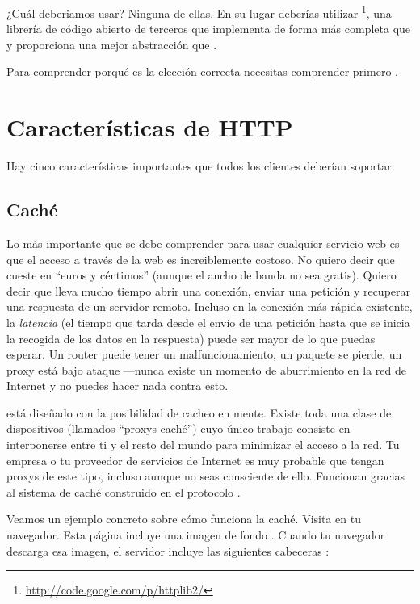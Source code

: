¿Cuál deberiamos usar? Ninguna de ellas. En su lugar deberías utilizar \footnote{\href{http://code.google.com/p/httplib2/}{http://code.google.com/p/httplib2/}}, una librería de código abierto de terceros que implementa  de forma más completa que  y proporciona una mejor abstracción que .

Para comprender porqué  es la elección correcta necesitas comprender primero .

\section{Características de HTTP}

Hay cinco características importantes que todos los clientes  deberían soportar.

\subsection{Caché}

Lo más importante que se debe comprender para usar cualquier servicio web es que el acceso a través de la web es increiblemente costoso. No quiero decir que cueste en ``euros y céntimos'' (aunque el ancho de banda no sea gratis). Quiero decir que lleva mucho tiempo abrir una conexión, enviar una petición y recuperar una respuesta de un servidor remoto. Incluso en la conexión más rápida existente, la \emph{latencia} (el tiempo que tarda desde el envío de una petición hasta que se inicia la recogida de los datos en la respuesta) puede ser mayor de lo que puedas esperar. Un router puede tener un malfuncionamiento, un paquete se pierde, un proxy está bajo ataque ---nunca existe un momento de aburrimiento en la red de Internet y no puedes hacer nada contra esto.


 está diseñado con la posibilidad de cacheo en mente. Existe toda una clase de dispositivos (llamados ``proxys caché'') cuyo único trabajo consiste en interponerse entre ti y el resto del mundo para minimizar el acceso a la red. Tu empresa o tu proveedor de servicios de Internet es muy probable que tengan proxys de este tipo, incluso aunque no seas consciente de ello. Funcionan gracias al sistema de caché construido en el protocolo .

Veamos un ejemplo concreto sobre cómo funciona la caché. Visita  en tu navegador. Esta página incluye una imagen de fondo . Cuando tu navegador descarga esa imagen, el servidor incluye las siguientes cabeceras :

